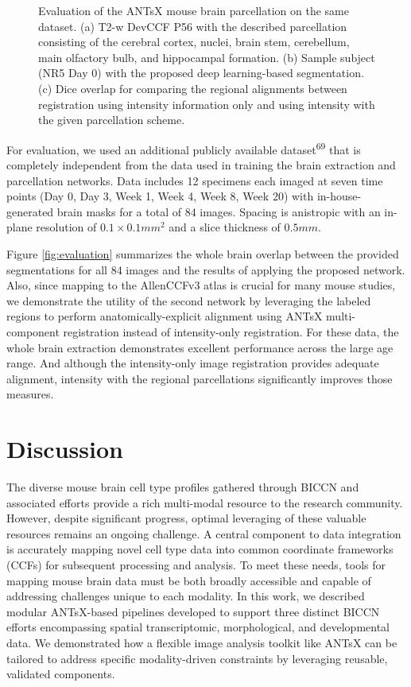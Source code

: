 \documentclass[
  12pt,
]{article}
\begin{document}
\begin{figure}
\begin{subfigure}{.75\textwidth}
  \caption{}
  \label{fig:subc}
\end{subfigure}
\caption{Evaluation of the ANTsX mouse brain parcellation on the same dataset.
(a) T2-w DevCCF P56 with the described parcellation consisting of the cerebral
cortex, nuclei, brain stem, cerebellum, main olfactory bulb, and hippocampal
formation. (b) Sample subject (NR5 Day 0) with the proposed deep learning-based
segmentation. (c) Dice overlap for comparing the regional alignments between
registration using intensity information only and using intensity with the given
parcellation scheme.}
\label{fig:evaluationParcellation}
\end{figure}

For evaluation, we used an additional publicly available
dataset\textsuperscript{69} that is completely independent from the data
used in training the brain extraction and parcellation networks. Data
includes 12 specimens each imaged at seven time points (Day 0, Day 3,
Week 1, Week 4, Week 8, Week 20) with in-house-generated brain masks for
a total of 84 images. Spacing is anistropic with an in-plane resolution
of \(0.1 \times 0.1 mm^2\) and a slice thickness of \(0.5 mm\).

Figure \ref{fig:evaluation} summarizes the whole brain overlap between
the provided segmentations for all 84 images and the results of applying
the proposed network. Also, since mapping to the AllenCCFv3 atlas is
crucial for many mouse studies, we demonstrate the utility of the second
network by leveraging the labeled regions to perform
anatomically-explicit alignment using ANTsX multi-component registration
instead of intensity-only registration. For these data, the whole brain
extraction demonstrates excellent performance across the large age
range. And although the intensity-only image registration provides
adequate alignment, intensity with the regional parcellations
significantly improves those measures.

\clearpage
\newpage

\section{Discussion}\label{discussion}

The diverse mouse brain cell type profiles gathered through BICCN and
associated efforts provide a rich multi-modal resource to the research
community. However, despite significant progress, optimal leveraging of
these valuable resources remains an ongoing challenge. A central
component to data integration is accurately mapping novel cell type data
into common coordinate frameworks (CCFs) for subsequent processing and
analysis. To meet these needs, tools for mapping mouse brain data must
be both broadly accessible and capable of addressing challenges unique
to each modality. In this work, we described modular ANTsX-based
pipelines developed to support three distinct BICCN efforts encompassing
spatial transcriptomic, morphological, and developmental data. We
demonstrated how a flexible image analysis toolkit like ANTsX can be
tailored to address specific modality-driven constraints by leveraging
reusable, validated components.
\end{document}
